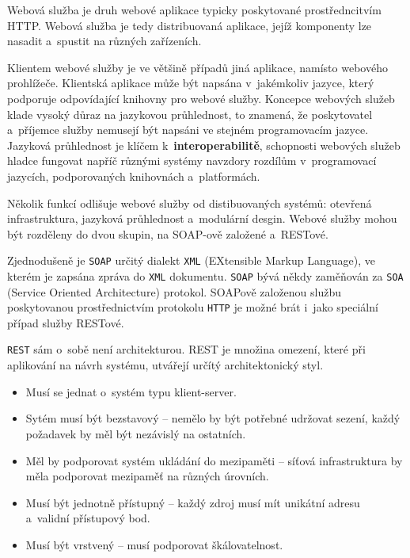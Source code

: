 \documentclass[12pt]{article}
\begin{document}
{

Webová služba
je druh webové aplikace typicky poskytované prostředncitvím HTTP. \cite{kalin}
Webová služba je tedy distribuovaná aplikace, jejíž komponenty lze nasadit a~spustit na různých zařízeních. 

Klientem webové služby je ve většině případů jiná aplikace, namísto webového prohlížeče.
Klientská aplikace může být napsána v~jakémkoliv jazyce, který podporuje
odpovídající knihovny pro webové služby.
Koncepce webových služeb klade vysoký důraz na jazykovou průhlednost, 
to znamená, že poskytovatel a~příjemce služby nemusejí být napsáni
ve stejném programovacím jazyce. 
Jazyková průhlednost je klíčem k~\textbf{interoperabilitě},
schopnosti webových služeb hladce fungovat napříč různými systémy navzdory rozdílům v~programovací jazycích,
podporovaných knihovnách a~platformách.

Několik funkcí odlišuje webové služby od distibuovaných systémů: otevřená infrastruktura,
jazyková průhlednost a~modulární desgin.
Webové služby mohou být rozděleny do dvou skupin, na SOAP-ově založené a~RESTové.


Zjednodušeně je \texttt{SOAP} určitý dialekt \texttt{XML}
(EXtensible Markup Language), ve kterém je zapsána zpráva do \texttt{XML} dokumentu.
\texttt{SOAP} bývá někdy zaměňován za \texttt{SOA} (Service Oriented Architecture) protokol.
SOAPově založenou službu poskytovanou prostřednictvím protokolu \texttt{HTTP}
je možné brát i~jako speciální případ služby RESTové.
\cite{kalin}


\texttt{REST} sám o~sobě není architekturou. REST je množina omezení,
které při aplikování na návrh systému, utvářejí určítý architektonický styl. 

\bigskip

\begin{itemize}
\item Musí se jednat o~systém typu klient-server.
\item Sytém musí být bezstavový -- nemělo by být potřebné udržovat sezení, každý požadavek by měl být nezávislý na ostatních.
\item Měl by podporovat systém ukládání do mezipaměti -- síťová infrastruktura by měla podporovat mezipaměť na různých úrovních.
\item Musí být jednotně přístupný -- každý zdroj musí mít unikátní adresu a~validní přístupový bod.
\item Musí být vrstvený -- musí podporovat škálovatelnost.
\end{itemize}

}
\end{document}
